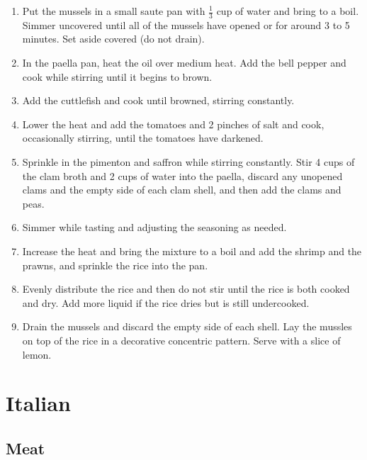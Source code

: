 \documentclass[a4paper, oneside]{book}
\begin{document}
\begin{multicols}{2}
{\begin{enumerate}
            to a simmer and cover for 30 mins. Remove from the heat and set
            aside.
        \item
            Put the mussels in a small saute pan with \(\frac{1}{3}\) cup of
            water and bring to a boil. Simmer uncovered until all of the
            mussels have opened or for around 3 to 5 minutes. Set aside covered
            (do not drain).
        \item
            In the paella pan, heat the oil over medium heat. Add the bell
            pepper and cook while stirring until it begins to brown.
        \item
            Add the cuttlefish and cook until browned, stirring constantly.
        \item
            Lower the heat and add the tomatoes and 2 pinches of salt
            and cook, occasionally stirring, until the tomatoes have darkened.
        \item
            Sprinkle in the pimenton and saffron while stirring constantly.
            Stir 4 cups of the clam broth and 2 cups of water into the paella,
            discard any unopened clams and the empty side of each clam shell,
            and then add the clams and peas.
        \item
            Simmer while tasting and adjusting the seasoning as needed.
        \item 
            Increase the heat and bring the mixture to a boil and add the
            shrimp and the prawns, and sprinkle the rice into the pan.
        \item
            Evenly distribute the rice and then do not stir until the rice
            is both cooked and dry. Add more liquid if the rice dries but is
            still undercooked.
        \item
            Drain the mussels and discard the empty side of each shell. Lay the
            mussles on top of the rice in a decorative concentric pattern.
            Serve with a slice of lemon.
    \end{enumerate}}

\end{multicols}

\chapter{Italian}
\section{Meat}
\end{document}
